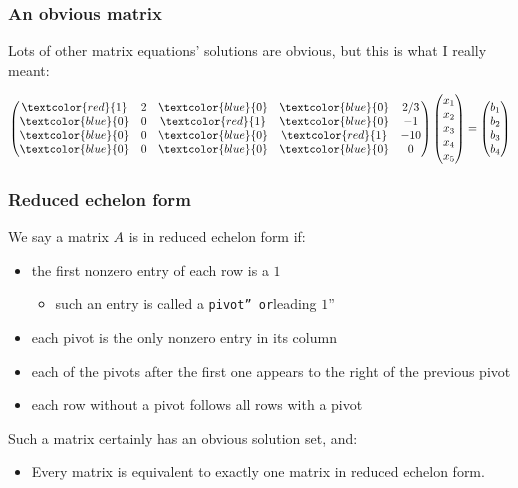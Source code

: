 \documentclass[11pt,ignorenonframetext,]{beamer}
\begin{document}
\begin{frame}\frametitle{An obvious matrix}

Lots of other matrix equations' solutions are obvious, but this is what
I really meant:

\begin{equation*}
    \begin{pmatrix}
        \textcolor{red}{1}  & 2 & \textcolor{blue}{0} & \textcolor{blue}{0} & 2/3  \\
        \textcolor{blue}{0} & 0 & \textcolor{red}{1}  & \textcolor{blue}{0} & -1  \\
        \textcolor{blue}{0} & 0 & \textcolor{blue}{0} & \textcolor{red}{1} & -10  \\
        \textcolor{blue}{0} & 0 & \textcolor{blue}{0} & \textcolor{blue}{0} &  0  \\
    \end{pmatrix} \begin{pmatrix}
        x_1 \\ x_2 \\ x_3 \\ x_4 \\ x_5 
    \end{pmatrix} = \begin{pmatrix}
        b_1 \\ b_2 \\ b_3 \\ b_4
    \end{pmatrix}
\end{equation*}

\end{frame}

\begin{frame}\frametitle{Reduced echelon form}

We say a matrix $A$ is in reduced echelon form if:

\begin{itemize}
\itemsep1pt\parskip0pt
\item
  the first nonzero entry of each row is a $1$

  \begin{itemize}
  \itemsep1pt\parskip0pt
  \item
    such an entry is called a \texttt{pivot'' or}leading $1$''
  \end{itemize}
\item
  each pivot is the only nonzero entry in its column
\item
  each of the pivots after the first one appears to the right of the
  previous pivot
\item
  each row without a pivot follows all rows with a pivot
\end{itemize}

Such a matrix certainly has an obvious solution set, and:

\begin{itemize}
\itemsep1pt\parskip0pt
\item
  Every matrix is equivalent to exactly one matrix in reduced echelon
  form.
\end{itemize}

\end{frame}
\end{document}
